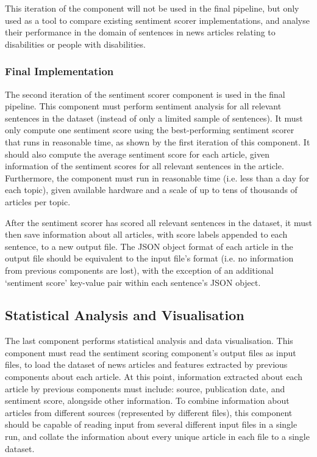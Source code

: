 \documentclass{report}
\begin{document}
This iteration of the component will not be used in the final pipeline, but only used as a tool to compare existing sentiment scorer implementations, and analyse their performance in the domain of sentences in news articles relating to disabilities or people with disabilities.

\subsubsection{Final Implementation} \label{req-sentiment-final}

The second iteration of the sentiment scorer component is used in the final pipeline.
This component must perform sentiment analysis for all relevant sentences in the dataset (instead of only a limited sample of sentences).
It must only compute one sentiment score using the best-performing sentiment scorer that runs in reasonable time, as shown by the first iteration of this component.
It should also compute the average sentiment score for each article, given information of the sentiment scores for all relevant sentences in the article.
Furthermore, the component must run in reasonable time (i.e. less than a day for each topic), given available hardware and a scale of up to tens of thousands of articles per topic.

After the sentiment scorer has scored all relevant sentences in the dataset, it must then save information about all articles, with score labels appended to each sentence, to a new output file.
The JSON object format of each article in the output file should be equivalent to the input file's format (i.e. no information from previous components are lost), with the exception of an additional `sentiment score' key-value pair within each sentence's JSON object.

\subsection{Statistical Analysis and Visualisation} \label{req-visualisation}

The last component performs statistical analysis and data visualisation.
This component must read the sentiment scoring component's output files as input files, to load the dataset of news articles and features extracted by previous components about each article.
At this point, information extracted about each article by previous components must include: source, publication date, and sentiment score, alongside other information.
To combine information about articles from different sources (represented by different files), this component should be capable of reading input from several different input files in a single run, and collate the information about every unique article in each file to a single dataset.
\end{document}
